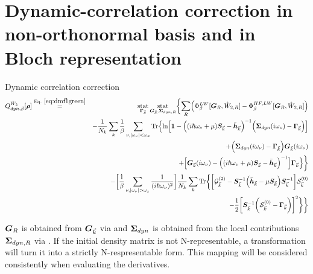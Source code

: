 \documentclass[11pt,a4paper]{report}
\begin{document}
\section{Dynamic-correlation correction in non-orthonormal basis and in Bloch representation}
\begin{myshadowminipage}{Dynamic correlation correction}
\begin{eqnarray}
Q^{\hat{W}_2}_{dyn,\beta}[\mat{\rho}] 
&\eqrel{eq:dmf1green}{=}&
\stat_{\mat{\Gamma}_{\vec{k}}}\stat_{\mat{G}_{\vec{k}},\mat{\Sigma}_{dyn,R}}\biggl\lbrace
\sum_R\Bigl(
\Phi^{LW}_\beta[\mat{G}_R,\hat{W}_{2,R}]
-\Phi^{HF,LW}_\beta[\mat{G}_R,\hat{W}_{2,R}]
\Bigr)
\nonumber\\ &&-\frac{1}{N_k}\sum_k
\frac{1}{\beta}\sum_{\nu,|\omega_\nu|<\omega_x}
\Tr\Bigl\lbrace \ln\Bigl[
  \mat{1}-
  \Bigl((i\hbar\omega_\nu+\mu)\mat{S}_{\vec{k}}-\bar{\mat{h}}_{\vec{k}}\Bigr)^{-1}
  \Bigl(\mat{\Sigma}_{dyn}(i\omega_\nu)-\mat{\Gamma}_{\vec{k}}\Bigr) \Bigr]
\nonumber\\
&&\hspace{3cm}
+\Bigl(\mat{\Sigma}_{dyn}(i\omega_\nu)-\mat{\Gamma}_{\vec{k}}\Bigr)
\mat{G}_{\vec{k}}(i\omega_\nu) 
\nonumber\\
&&\hspace{3cm}+
\Bigl[ \mat{G}_{\vec{k}}(i\omega_\nu)
  -\Bigl((i\hbar\omega_\nu+\mu)\mat{S}_{\vec{k}}
-\bar{\mat{h}}_{\vec{k}}\Bigr)^{-1} \Bigr]
\mat{\Gamma}_{\vec{k}}\Bigr\rbrace \biggr\rbrace 
\nonumber\\
&&-
\biggl[\frac{1}{\beta}\sum_{\nu,|\omega_\nu|>\omega_x}
\frac{1}{(i\hbar\omega_\nu)^2}\biggr]
\frac{1}{N_k}\sum_k
\Tr\biggl\lbrace
\biggl[
\mathcal{\mat{G}}^{(2)}_{\vec{k}}
-\mat{S}^{-1}_{\vec{k}}\Bigl(\bar{\mat{h}}_{\vec{k}}-\mu\mat{S}_{\vec{k}}\Bigr)\mat{S}^{-1}_{\vec{k}}
\biggr]
\mathcal{\mat{S}}^{(0)}_{\vec{k}}
\nonumber\\
&&\hspace{5cm}-
\frac{1}{2}
\biggl[
\mat{S}^{-1}_{\vec{k}}
\biggl(\mathcal{\mat{S}}^{(0)}_{\vec{k}}-\mat{\Gamma}_{\vec{k}}\biggr)
\biggr]^2\biggr\rbrace
\biggr\rbrace
\label{eq:dmf1greenb}
\end{eqnarray}

$\bm{G}_R$ is obtained from $\bm{G}_{\vec{k}}$ via
 and $\bm{\Sigma}_{dyn}$ is obtained from the
local contributions $\bm{\Sigma}_{dyn,R}$ via .
If the initial density matrix is not N-representable, a transformation
will turn it into a strictly N-respresentable form. This mapping will
be considered consistently when evaluating the derivatives.


\end{myshadowminipage}
\end{document}
